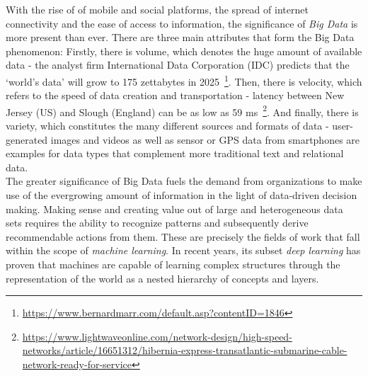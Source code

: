 With the rise of of mobile and social platforms, the spread of internet connectivity and the ease of access to information, the significance of \textit{Big Data} is more present than ever. There are three main attributes that form the Big Data phenomenon: Firstly, there is volume, which denotes the huge amount of available data - the analyst firm International Data Corporation (IDC) predicts that the `world's data' will grow to 175 zettabytes in 2025~\footnote{\url{https://www.bernardmarr.com/default.asp?contentID=1846}}. Then, there is velocity, which refers to the speed of data creation and transportation - latency between New Jersey (US) and Slough (England) can be as low as 59 ms~\footnote{\url{https://www.lightwaveonline.com/network-design/high-speed-networks/article/16651312/hibernia-express-transatlantic-submarine-cable-network-ready-for-service}}. And finally, there is variety, which constitutes the many different sources and formats of data - user-generated images and videos as well as sensor or GPS data from smartphones are examples for data types that complement more traditional text and relational data. \\
The greater significance of Big Data fuels the demand from organizations to make use of the evergrowing amount of information in the light of data-driven decision making. Making sense and creating value out of large and heterogeneous data sets requires the ability to recognize patterns and subsequently derive recommendable actions from them. These are precisely the fields of work that fall within the scope of \textit{machine learning}. In recent years, its subset \textit{deep learning} has proven that machines are capable of learning complex structures through the representation of the world as a nested hierarchy of concepts and layers.

